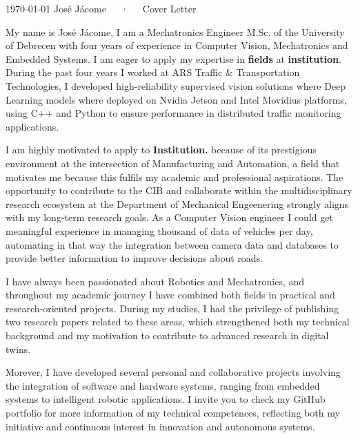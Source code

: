 \documentclass[11pt, a4paper]{awesome-cv}
\begin{document}
\makecvheader[R]

\makecvfooter
  {\today}
  {José Jácome~~~·~~~Cover Letter}
  {}

\makelettertitle

\begin{cvletter}

My name is José Jácome, I am a Mechatronics Engineer M.Sc. of the University of Debrecen with four years of experience in Computer Vision, Mechatronics and Embedded Systems. 
I am eager to apply my expertise in \textbf{fields} at \textbf{institution}. 
During the past four years I worked at ARS Traffic \& Transportation Technologies, I developed high-reliability supervised vision solutions where Deep Learning models 
where deployed on Nvidia Jetson and Intel Movidius platforms, using C++ and Python to ensure performance in distributed traffic monitoring applications.

I am highly motivated to apply to \textbf{Institution.} because of its prestigious environment at the intersection of Manufacturing and Automation,
a field that motivates me because this fulfils my academic and professional aspirations. 
The opportunity to contribute to the CIB and collaborate within the multidisciplinary research ecosystem at the Department of Mechanical Engeenering strongly aligns with my long-term research goals.
As a Computer Vision engineer I could get meaningful experience in managing thousand of data of vehicles per day, automating in that way the integration between camera data and databases to provide better information to improve decisions about roads.


I have always been passionated about Robotics and Mechatronics, and throughout my academic journey I have combined both fields in practical and research-oriented projects. During my studies, I had the privilege of publishing two research papers related to these areas, which strengthened both my technical background and my motivation to contribute to advanced research in digital twins.

Morever, I have developed several personal and collaborative projects involving the integration of software and hardware systems, ranging from embedded systems to intelligent robotic applications. I invite you to check my GitHub portfolio for more information of my technical competences, reflecting both my initiative and continuous interest in innovation and autonomous systems.
\end{cvletter}

\makeletterclosing
\end{document}
